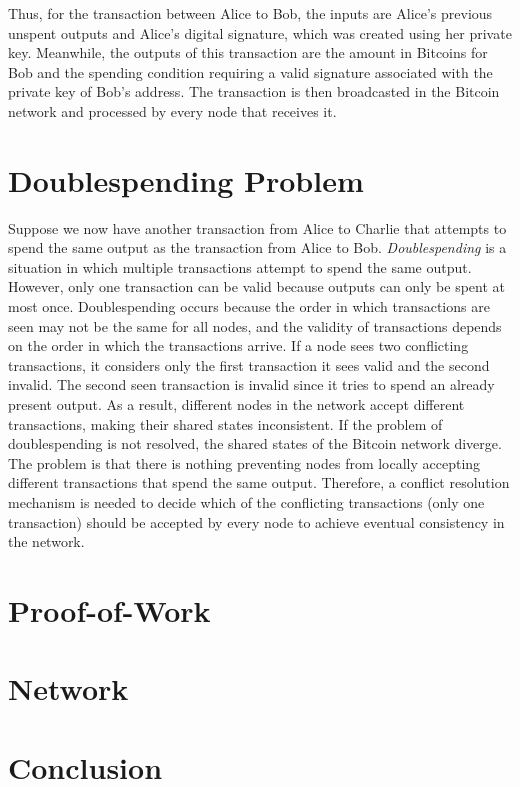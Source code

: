 \documentclass{article}
\begin{document}
Thus, for the transaction between Alice to Bob, the inputs are Alice's previous
unspent outputs and Alice's digital signature, which was created using her
private key. Meanwhile, the outputs of this transaction are the amount in
Bitcoins for Bob and the spending condition requiring a valid signature
associated with the private key of Bob's address. The transaction is then
broadcasted in the Bitcoin network and processed by every node that receives it.

\section{Doublespending Problem}

Suppose we now have another transaction from Alice to Charlie that attempts to
spend the same output as the transaction from Alice to Bob.
\emph{Doublespending} is a situation in which multiple transactions attempt to
spend the same output. However, only one transaction can be valid because
outputs can only be spent at most once. Doublespending occurs because the order
in which transactions are seen may not be the same for all nodes, and the
validity of transactions depends on the order in which the transactions arrive.
If a node sees two conflicting transactions, it considers only the first
transaction it sees valid and the second invalid. The second seen transaction is
invalid since it tries to spend an already present output. As a result,
different nodes in the network accept different transactions, making their
shared states inconsistent. If the problem of doublespending is not resolved,
the shared states of the Bitcoin network diverge. The problem is that there is
nothing preventing nodes from locally accepting different transactions that
spend the same output. Therefore, a conflict resolution mechanism is needed to
decide which of the conflicting transactions (only one transaction) should be
accepted by every node to achieve eventual consistency in the network.

\section{Proof-of-Work}

\section{Network}

\section{Conclusion}



\end{document}
